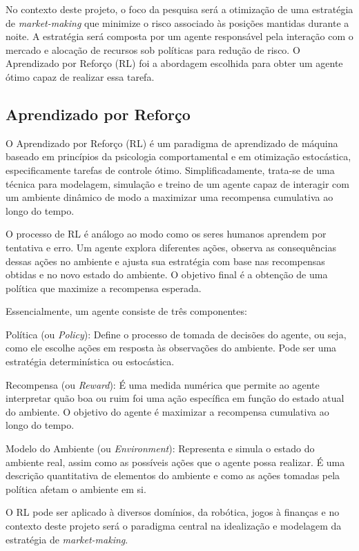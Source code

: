 No contexto deste projeto, o foco da pesquisa será a otimização de uma estratégia de \textit{market-making} que minimize o risco associado às posições mantidas durante a noite. A estratégia será composta por um agente responsável pela interação com o mercado e alocação de recursos sob políticas para redução de risco. O Aprendizado por Reforço (RL) foi a abordagem escolhida para obter um agente ótimo capaz de realizar essa tarefa.

\subsection{Aprendizado por Reforço}
O Aprendizado por Reforço (RL) é um paradigma de aprendizado de máquina baseado em princípios da psicologia comportamental e em otimização estocástica, especificamente tarefas de controle ótimo. Simplificadamente, trata-se de uma técnica para modelagem, simulação e treino de um agente capaz de interagir com um ambiente dinâmico de modo a maximizar uma recompensa cumulativa ao longo do tempo.

O processo de RL é análogo ao modo como os seres humanos aprendem por tentativa e erro. Um agente explora diferentes ações, observa as consequências dessas ações no ambiente e ajusta sua estratégia com base nas recompensas obtidas e no novo estado do ambiente. O objetivo final é a obtenção de uma política que maximize a recompensa esperada.

Essencialmente, um agente consiste de três componentes:

Política (ou \textit{Policy}): Define o processo de tomada de decisões do agente, ou seja, como ele escolhe ações em resposta às observações do ambiente. Pode ser uma estratégia determinística ou estocástica.

Recompensa (ou \textit{Reward}): É uma medida numérica que permite ao agente interpretar quão boa ou ruim foi uma ação específica em função do estado atual do ambiente. O objetivo do agente é maximizar a recompensa cumulativa ao longo do tempo.

Modelo do Ambiente (ou \textit{Environment}): Representa e simula o estado do ambiente real, assim como as possíveis ações que o agente possa realizar. É uma descrição quantitativa de elementos do ambiente e como as ações tomadas pela política afetam o ambiente em si.

O RL pode ser aplicado à diversos domínios, da robótica, jogos à finanças e no contexto deste projeto será o paradigma central na idealização e modelagem da estratégia de \textit{market-making}.
